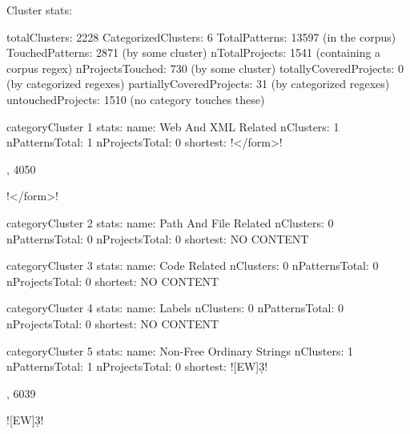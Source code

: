 Cluster stats:

totalClusters: 2228
CategorizedClusters: 6
TotalPatterns: 13597 (in the corpus)
TouchedPatterns: 2871 (by some cluster)
nTotalProjects: 1541 (containing a corpus regex)
nProjectsTouched: 730 (by some cluster)
totallyCoveredProjects: 0 (by categorized regexes)
partiallyCoveredProjects: 31 (by categorized regexes)
untouchedProjects: 1510 (no category touches these)

\begin{multicols}{1}
\begin{description}[noitemsep,topsep=0pt]
categoryCluster 1 stats:
name: Web And XML Related
nClusters: 1
nPatternsTotal: 1
nProjectsTotal: 0
shortest: \cverb!</form\s*>!

, 4050 \item [7 \<1\>] \cverb!</form\s*>!
\end{description}
\end{multicols}



\begin{multicols}{1}
\begin{description}[noitemsep,topsep=0pt]
categoryCluster 2 stats:
name: Path And File Related
nClusters: 0
nPatternsTotal: 0
nProjectsTotal: 0
shortest: NO CONTENT

\end{description}
\end{multicols}



\begin{multicols}{1}
\begin{description}[noitemsep,topsep=0pt]
categoryCluster 3 stats:
name: Code Related
nClusters: 0
nPatternsTotal: 0
nProjectsTotal: 0
shortest: NO CONTENT

\end{description}
\end{multicols}



\begin{multicols}{1}
\begin{description}[noitemsep,topsep=0pt]
categoryCluster 4 stats:
name: Labels
nClusters: 0
nPatternsTotal: 0
nProjectsTotal: 0
shortest: NO CONTENT

\end{description}
\end{multicols}



\begin{multicols}{1}
\begin{description}[noitemsep,topsep=0pt]
categoryCluster 5 stats:
name: Non-Free Ordinary Strings
nClusters: 1
nPatternsTotal: 1
nProjectsTotal: 0
shortest: \cverb![EW]\d{3}!

, 6039 \item [8 \<1\>] \cverb![EW]\d{3}!
\end{description}
\end{multicols}



